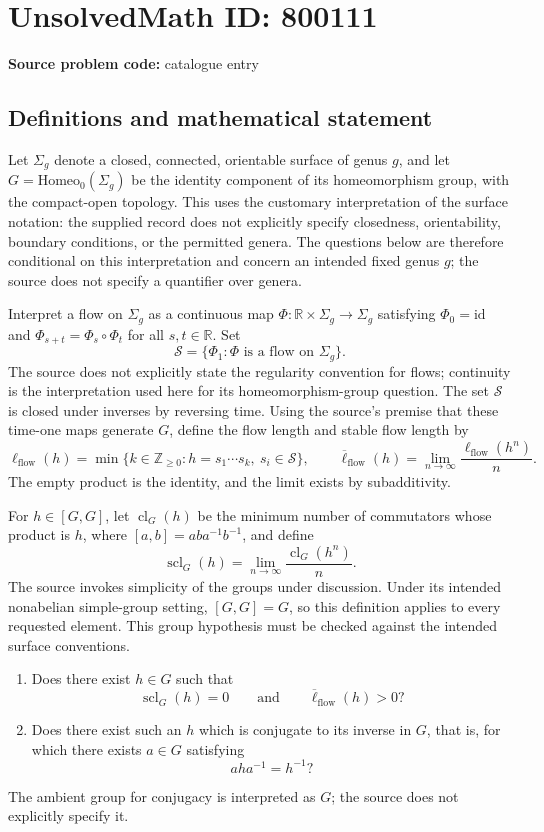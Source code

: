 \documentclass[11pt]{article}
\newcommand{\Z}{\mathbb{Z}}
\newcommand{\R}{\mathbb{R}}
\begin{document}
\section*{UnsolvedMath ID: 800111}
\textbf{Source problem code:} catalogue entry
\subsection{Definitions and mathematical statement}
Let \(\Sigma_g\) denote a closed, connected, orientable surface of genus \(g\), and let \(G=\mathrm{Homeo}_0(\Sigma_g)\) be the identity component of its homeomorphism group, with the compact-open topology. This uses the customary interpretation of the surface notation: the supplied record does not explicitly specify closedness, orientability, boundary conditions, or the permitted genera. The questions below are therefore conditional on this interpretation and concern an intended fixed genus \(g\); the source does not specify a quantifier over genera.

Interpret a flow on \(\Sigma_g\) as a continuous map \(\Phi:\R\times\Sigma_g\to\Sigma_g\) satisfying \(\Phi_0=\mathrm{id}\) and \(\Phi_{s+t}=\Phi_s\circ\Phi_t\) for all \(s,t\in\R\). Set
\[
\mathcal S=\{\Phi_1:\Phi\text{ is a flow on }\Sigma_g\}.
\]
The source does not explicitly state the regularity convention for flows; continuity is the interpretation used here for its homeomorphism-group question. The set \(\mathcal S\) is closed under inverses by reversing time. Using the source's premise that these time-one maps generate \(G\), define the flow length and stable flow length by
\[
\ell_{\mathrm{flow}}(h)=\min\{k\in\Z_{\geq0}:h=s_1\cdots s_k,\ s_i\in\mathcal S\},
\qquad
\overline\ell_{\mathrm{flow}}(h)=\lim_{n\to\infty}\frac{\ell_{\mathrm{flow}}(h^n)}{n}.
\]
The empty product is the identity, and the limit exists by subadditivity.

For \(h\in[G,G]\), let \(\operatorname{cl}_G(h)\) be the minimum number of commutators whose product is \(h\), where \([a,b]=aba^{-1}b^{-1}\), and define
\[
\operatorname{scl}_G(h)=\lim_{n\to\infty}\frac{\operatorname{cl}_G(h^n)}{n}.
\]
The source invokes simplicity of the groups under discussion. Under its intended nonabelian simple-group setting, \([G,G]=G\), so this definition applies to every requested element. This group hypothesis must be checked against the intended surface conventions.

\begin{enumerate}
\item Does there exist \(h\in G\) such that
\[
\operatorname{scl}_G(h)=0
\qquad\text{and}\qquad
\overline\ell_{\mathrm{flow}}(h)>0?
\]
\item Does there exist such an \(h\) which is conjugate to its inverse in \(G\), that is, for which there exists \(a\in G\) satisfying
\[
 a h a^{-1}=h^{-1}?
\]
\end{enumerate}
The ambient group for conjugacy is interpreted as \(G\); the source does not explicitly specify it.
\end{document}
